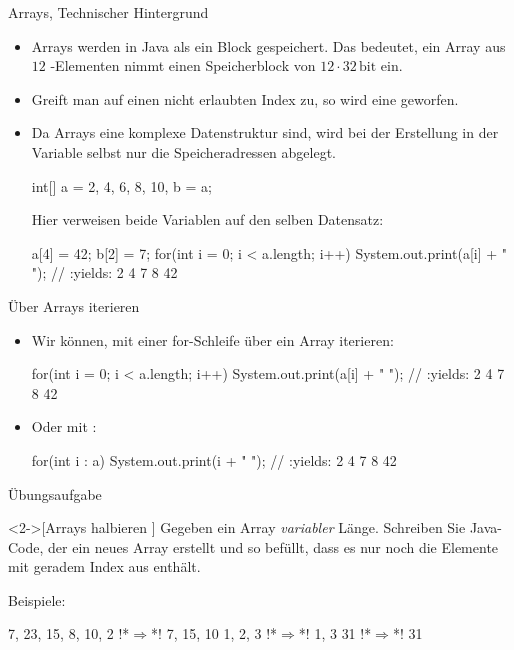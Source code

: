 \begin{frame}[fragile]{Arrays, Technischer Hintergrund}
    \begin{itemize}[<+(1)->]
        \widei
        \item Arrays werden in Java als ein Block gespeichert.\pause{} Das bedeutet, ein Array aus \(12\) -Elementen nimmt einen Speicherblock von \(12 \cdot 32\,\text{bit}\) ein.
        \item Greift man auf einen nicht erlaubten Index zu,\pause{} so wird eine  geworfen.
        \item Da Arrays eine komplexe Datenstruktur sind, wird bei der Erstellung in der Variable selbst nur die Speicheradressen abgelegt.\pause{}
\begin{plainjava}
int[] a = {2, 4, 6, 8, 10}, b = a;
\end{plainjava}
        \pause{}Hier verweisen beide Variablen auf den selben Datensatz:\pause{}
\begin{plainjava}
a[4] = 42; b[2] = 7;
for(int i = 0; i < a.length; i++)
    System.out.print(a[i] + " "); // :yields: 2 4 7 8 42
\end{plainjava}
    \end{itemize}
\end{frame}

\begin{frame}[fragile]{Über Arrays iterieren}
    \begin{itemize}[<+(1)->]
        \widei
        \item Wir können,\pause{} mit einer for-Schleife über ein Array iterieren:\pause{}
\begin{plainjava}
for(int i = 0; i < a.length; i++) {
    System.out.print(a[i] + " "); // :yields: 2 4 7 8 42
}
\end{plainjava}
        \item Oder mit :\pause{}
\begin{plainjava}
for(int i : a) {
    System.out.print(i + " "); // :yields: 2 4 7 8 42
}
\end{plainjava}
    \end{itemize}
\end{frame}


\ifull
\begin{frame}[c,fragile]{Übungsaufgabe}
\begin{exercise}<2->[Arrays halbieren ]
    Gegeben ein Array  \emph{variabler} Länge. Schreiben Sie Java-Code, der ein neues Array  erstellt und so befüllt, dass es nur noch die Elemente mit geradem Index aus  enthält.\par\pause{}
    Beispiele:\pause
\begin{plainjava}
{7, 23, 15, 8, 10, 2} !*$\Rightarrow$*! {7, 15, 10}
{1, 2, 3} !*$\Rightarrow$*! {1, 3}
{31} !*$\Rightarrow$*! {31}
\end{plainjava}
\end{exercise}
\end{frame}

